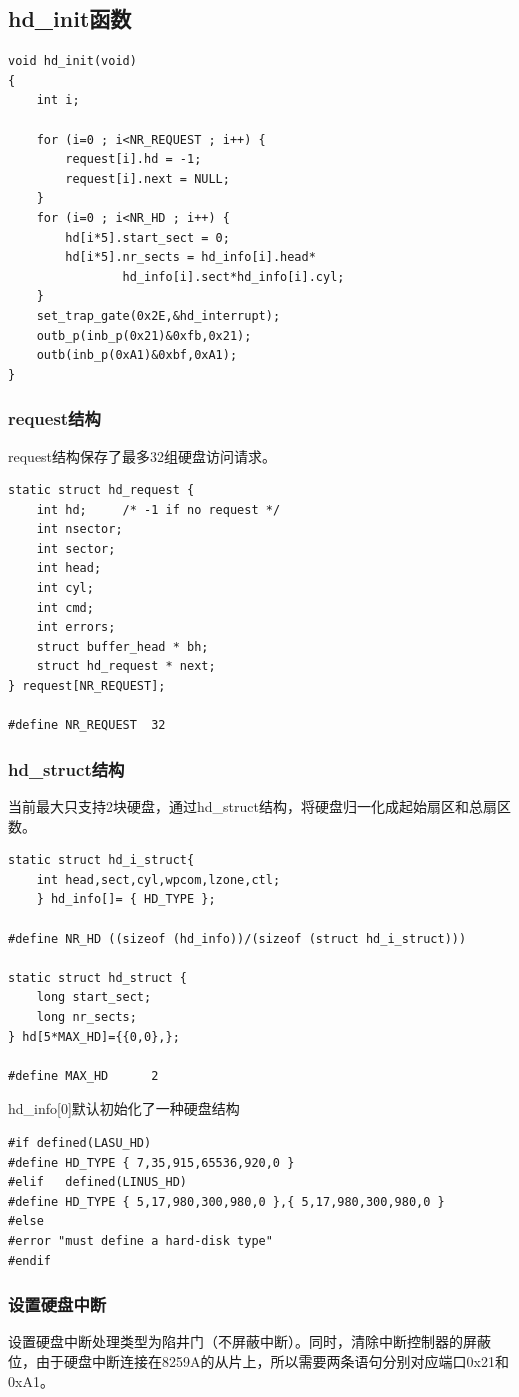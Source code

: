 \documentclass[12pt]{article}
\begin{document}
\subsection{hd\_init函数}
\begin{lstlisting}[breaklines]
void hd_init(void)
{
	int i;

	for (i=0 ; i<NR_REQUEST ; i++) {
		request[i].hd = -1;
		request[i].next = NULL;
	}
	for (i=0 ; i<NR_HD ; i++) {
		hd[i*5].start_sect = 0;
		hd[i*5].nr_sects = hd_info[i].head*
				hd_info[i].sect*hd_info[i].cyl;
	}
	set_trap_gate(0x2E,&hd_interrupt);
	outb_p(inb_p(0x21)&0xfb,0x21);
	outb(inb_p(0xA1)&0xbf,0xA1);
}	
\end{lstlisting}	
\subsubsection{request结构}
request结构保存了最多32组硬盘访问请求。
\begin{lstlisting}[breaklines]
static struct hd_request {
	int hd;		/* -1 if no request */
	int nsector;
	int sector;
	int head;
	int cyl;
	int cmd;
	int errors;
	struct buffer_head * bh;
	struct hd_request * next;
} request[NR_REQUEST];

#define NR_REQUEST	32
\end{lstlisting}	
\subsubsection{hd\_struct结构}
当前最大只支持2块硬盘，通过hd\_struct结构，将硬盘归一化成起始扇区和总扇区数。
\begin{lstlisting}[breaklines]
static struct hd_i_struct{
	int head,sect,cyl,wpcom,lzone,ctl;
	} hd_info[]= { HD_TYPE };

#define NR_HD ((sizeof (hd_info))/(sizeof (struct hd_i_struct)))

static struct hd_struct {
	long start_sect;
	long nr_sects;
} hd[5*MAX_HD]={{0,0},};

#define MAX_HD		2
\end{lstlisting}	
hd\_info[0]默认初始化了一种硬盘结构
\begin{lstlisting}[breaklines]
#if	defined(LASU_HD)
#define HD_TYPE { 7,35,915,65536,920,0 }
#elif	defined(LINUS_HD)
#define HD_TYPE { 5,17,980,300,980,0 },{ 5,17,980,300,980,0 }
#else
#error "must define a hard-disk type"
#endif
\end{lstlisting}	
\subsubsection{设置硬盘中断}
设置硬盘中断处理类型为陷井门（不屏蔽中断）。同时，清除中断控制器的屏蔽位，由于硬盘中断连接在8259A的从片上，所以需要两条语句分别对应端口0x21和0xA1。
\end{document}
